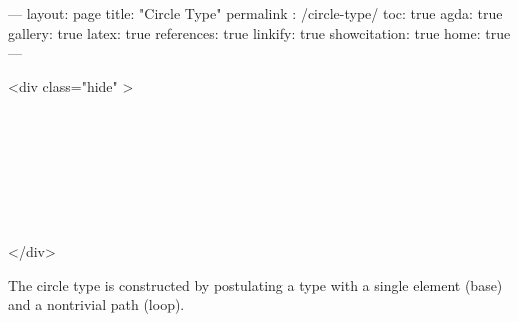 ---
layout: page
title: "Circle Type"
permalink : /circle-type/
toc: true
agda: true
gallery: true
latex: true
references: true
linkify: true
showcitation: true
home: true
---

<div class="hide" >
\begin{code}%
\>[0]\AgdaSymbol{\{-\#}\AgdaSpace{}%
\AgdaSpace{}%
\AgdaSpace{}%
\AgdaSymbol{\#-\}}\<%
\\
\>[0]\AgdaSpace{}%
\AgdaSpace{}%
\<%
\\
\>[0]\AgdaSpace{}%
\AgdaSpace{}%
\<%
\\
%
\\[\AgdaEmptyExtraSkip]%
\>[0]\AgdaSpace{}%
\AgdaSpace{}%
\<%
\\
\>[0]\AgdaSpace{}%
\AgdaSpace{}%
\<%
\\
\>[0]\AgdaSpace{}%
\AgdaSpace{}%
\<%
\end{code}
</div>

The circle type is constructed by postulating a type with
a single element (base) and a nontrivial path (loop).

